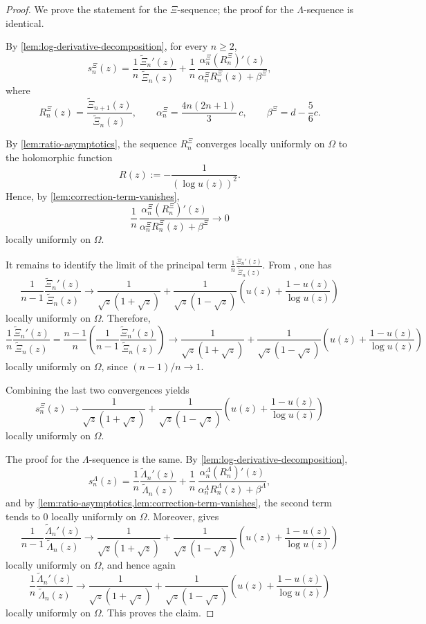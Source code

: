 \documentclass[11pt,twoside]{article}
\numberwithin{equation}{section}
\begin{document}
\begin{proof}
We prove the statement for the \(\Xi\)-sequence; the proof for the \(\Lambda\)-sequence is identical.

By \cref{lem:log-derivative-decomposition}, for every \(n\ge2\),
\[
s_n^\Xi(z)
=
\frac1n\frac{\widetilde{\Xi}_n'(z)}{\widetilde{\Xi}_n(z)}
+
\frac1n\,
\frac{\alpha_n^\Xi (R_n^\Xi)'(z)}
{\alpha_n^\Xi R_n^\Xi(z)+\beta^\Xi},
\]
where
\[
R_n^\Xi(z)=\frac{\widetilde{\Xi}_{n+1}(z)}{\widetilde{\Xi}_n(z)},
\qquad
\alpha_n^\Xi=\frac{4n(2n+1)}{3}\,c,
\qquad
\beta^\Xi=d-\frac56c.
\]

By \cref{lem:ratio-asymptotics}, the sequence \(R_n^\Xi\) converges locally uniformly on \(\Omega\) to the holomorphic function
\[
R(z):=-\frac{1}{(\log u(z))^2}.
\]
Hence, by \cref{lem:correction-term-vanishes},
\[
\frac1n\,
\frac{\alpha_n^\Xi (R_n^\Xi)'(z)}
{\alpha_n^\Xi R_n^\Xi(z)+\beta^\Xi}
\longrightarrow 0
\]
locally uniformly on \(\Omega\).

It remains to identify the limit of the principal term \(\displaystyle \frac1n\frac{\widetilde{\Xi}_n'(z)}{\widetilde{\Xi}_n(z)}\). From \cite[Lemma~16.1]{TallaWaffo2026arxiv2602.16761}, one has
\[
\frac{1}{n-1}\frac{\widetilde{\Xi}_n'(z)}{\widetilde{\Xi}_n(z)}
\longrightarrow
\frac{1}{\sqrt z(1+\sqrt z)}
+
\frac{1}{\sqrt z(1-\sqrt z)}
\left(
u(z)+\frac{1-u(z)}{\log u(z)}
\right)
\]
locally uniformly on \(\Omega\). Therefore,
\[
\frac1n\frac{\widetilde{\Xi}_n'(z)}{\widetilde{\Xi}_n(z)}
=
\frac{n-1}{n}
\left(
\frac{1}{n-1}\frac{\widetilde{\Xi}_n'(z)}{\widetilde{\Xi}_n(z)}
\right)
\longrightarrow
\frac{1}{\sqrt z(1+\sqrt z)}
+
\frac{1}{\sqrt z(1-\sqrt z)}
\left(
u(z)+\frac{1-u(z)}{\log u(z)}
\right)
\]
locally uniformly on \(\Omega\), since \((n-1)/n\to1\).

Combining the last two convergences yields
\[
s_n^\Xi(z)\longrightarrow
\frac{1}{\sqrt z(1+\sqrt z)}
+
\frac{1}{\sqrt z(1-\sqrt z)}
\left(
u(z)+\frac{1-u(z)}{\log u(z)}
\right)
\]
locally uniformly on \(\Omega\).

The proof for the \(\Lambda\)-sequence is the same. By \cref{lem:log-derivative-decomposition},
\[
s_n^\Lambda(z)
=
\frac1n\frac{\widetilde{\Lambda}_n'(z)}{\widetilde{\Lambda}_n(z)}
+
\frac1n\,
\frac{\alpha_n^\Lambda (R_n^\Lambda)'(z)}
{\alpha_n^\Lambda R_n^\Lambda(z)+\beta^\Lambda},
\]
and by \cref{lem:ratio-asymptotics,lem:correction-term-vanishes}, the second term tends to \(0\) locally uniformly on \(\Omega\). Moreover, \cite[Lemma~16.1]{TallaWaffo2026arxiv2602.16761} gives
\[
\frac{1}{n-1}\frac{\widetilde{\Lambda}_n'(z)}{\widetilde{\Lambda}_n(z)}
\longrightarrow
\frac{1}{\sqrt z(1+\sqrt z)}
+
\frac{1}{\sqrt z(1-\sqrt z)}
\left(
u(z)+\frac{1-u(z)}{\log u(z)}
\right)
\]
locally uniformly on \(\Omega\), and hence again
\[
\frac1n\frac{\widetilde{\Lambda}_n'(z)}{\widetilde{\Lambda}_n(z)}
\longrightarrow
\frac{1}{\sqrt z(1+\sqrt z)}
+
\frac{1}{\sqrt z(1-\sqrt z)}
\left(
u(z)+\frac{1-u(z)}{\log u(z)}
\right)
\]
locally uniformly on \(\Omega\). This proves the claim.
\end{proof}
\end{document}
